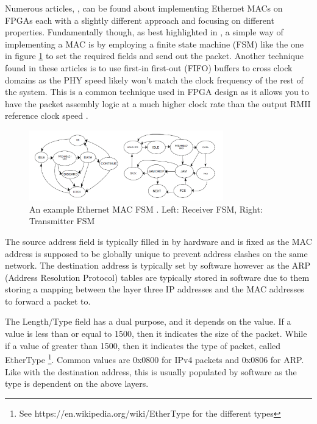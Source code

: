 Numerous articles, \cite{OptimisedEthernetMAC} \cite{EthernetAXI} \cite{EthernetRMII}, can be found about implementing Ethernet MACs 
on FPGAs each with a slightly different approach and focusing on different properties. Fundamentally though, as best highlighted in \cite{OptimisedEthernetMAC}, a simple way of implementing a MAC is by employing a finite state machine (FSM) like the one in figure \ref{fig:eth_fsm} to set the required fields and send out the packet. Another technique found in these articles is to use first-in first-out (FIFO) buffers to cross clock domains as the PHY speed likely won't match the clock frequency of the rest of the system. This is a common technique used in FPGA design as it allows you to have the packet assembly logic at a much higher clock rate than the output RMII reference clock speed \cite{EthernetAXI}. 


\begin{figure}[h]
    \centering
    \includegraphics[width=0.75\textwidth]{Images/eth_fsm.png}
    \caption[An example Ethernet MAC FSM]{An example Ethernet MAC FSM \cite{OptimisedEthernetMAC}. Left: Receiver FSM, Right: Transmitter FSM}
    \label{fig:eth_fsm}
\end{figure}

\noindent The source address field is typically filled in by hardware and is fixed as the MAC address is supposed to be globally unique to prevent address clashes on the same network. The destination address is typically set by software however as the ARP (Address Resolution Protocol) tables are typically stored in software due to them storing a mapping between the layer three IP addresses and the MAC addresses to forward a packet to. 

The Length/Type field has a dual purpose, and it depends on the value. If a value is less than or equal to 1500, then it indicates the size of the packet. While if a value of greater than 1500, then it indicates the type of packet, called EtherType \footnote[1]{See https://en.wikipedia.org/wiki/EtherType for the different types}. Common values are 0x0800 for IPv4 packets and 0x0806 for ARP. Like with the destination address, this is usually populated by software as the type is dependent on the above layers.


